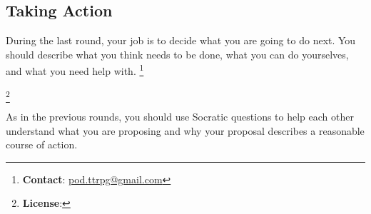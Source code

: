 \documentclass[a6paper, 11pt, parskip=half, DIV=15]{scrartcl}
\newcommand\blfootnote[1]{%
  \begingroup
  \renewcommand\thefootnote{}\footnote{#1}%
  \addtocounter{footnote}{-1}%
  \endgroup
}
\renewcommand{\thefootnote}{\fnsymbol{footnote}}
\begin{document}
\newpage
\enlargethispage{1.75\baselineskip}

\subsection*{Taking Action}
During the last round, your job is to decide what you are going to do next.
You should describe what you think needs to be done, what you can do yourselves, and what you need help with.
\blfootnote{\textbf{Contact}: \href{mailto:pod.ttrpg@gmail.com}{pod.ttrpg@gmail.com}}
\blfootnote{\textbf{License}: \raggedright\doclicenseLongText}

As in the previous rounds, you should use Socratic questions to help each other understand what you are proposing and why your proposal describes a reasonable course of action.

\vfill


\vfill
\end{document}
